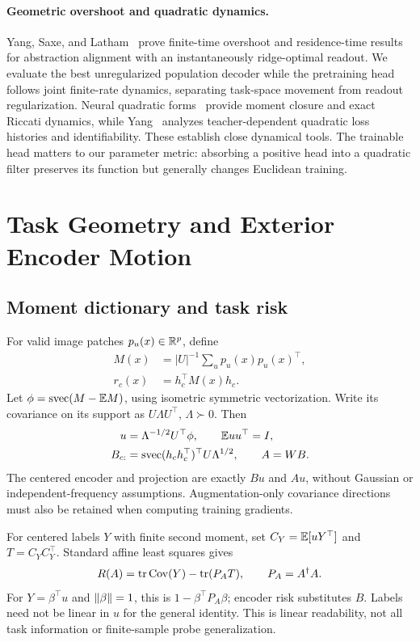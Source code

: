 \paragraph{Geometric overshoot and quadratic dynamics.}
Yang, Saxe, and Latham~\cite{yang2026abstraction} prove finite-time overshoot and residence-time results for abstraction alignment with an instantaneously ridge-optimal readout. We evaluate the best unregularized population decoder while the pretraining head follows joint finite-rate dynamics, separating task-space movement from readout regularization. Neural quadratic forms~\cite{liu2026nqf} provide moment closure and exact Riccati dynamics, while Yang~\cite{yang2026spectral} analyzes teacher-dependent quadratic loss histories and identifiability. These establish close dynamical tools. The trainable head matters to our parameter metric: absorbing a positive head into a quadratic filter preserves its function but generally changes Euclidean training.

\section{Task Geometry and Exterior Encoder Motion}
\label{main:geometry}
\subsection{Moment dictionary and task risk}
For valid image patches $p_u(x)\in\mathbb R^p$, define
\begin{align}
 M(x)&=|U|^{-1}\sum_u p_u(x)p_u(x)^\top,\nonumber\\
 r_c(x)&=h_c^\top M(x)h_c.
\end{align}
Let $\phi=\operatorname{svec}(M-\mathbb E M)$, using isometric symmetric vectorization. Write its covariance on its support as $U\Lambda U^\top$, $\Lambda\succ0$. Then
\begin{align}
 u&=\Lambda^{-1/2}U^\top\phi,\qquad \mathbb E uu^\top=I,\\
 B_{c:}&=\operatorname{svec}(h_ch_c^\top)^\top U\Lambda^{1/2},\qquad A=WB.
 \label{main:moment-map}
\end{align}
The centered encoder and projection are exactly $Bu$ and $Au$, without Gaussian or independent-frequency assumptions. Augmentation-only covariance directions must also be retained when computing training gradients.

For centered labels $Y$ with finite second moment, set $C_Y=\mathbb E[uY^\top]$ and $T=C_YC_Y^\top$. Standard affine least squares gives
\begin{equation}
 R(A)=\operatorname{tr}\operatorname{Cov}(Y)-\operatorname{tr}(P_AT),\qquad P_A=A^\dagger A.
 \label{main:task-risk}
\end{equation}
For $Y=\beta^\top u$ and $\left\lVert \beta\right\rVert=1$, this is $1-\beta^\top P_A\beta$; encoder risk substitutes $B$. Labels need not be linear in $u$ for the general identity. This is linear readability, not all task information or finite-sample probe generalization.

